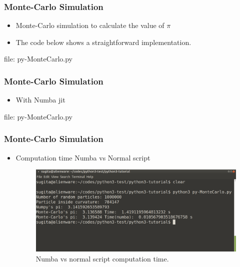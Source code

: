 \begin{frame}[fragile]
\frametitle{Monte-Carlo Simulation}
\newcommand{\newfilename}{py-MonteCarlo.py}
\begin{itemize}
\item Monte-Carlo simulation to calculate the value of $\pi$
\item The code below shows a straightforward implementation.

\end{itemize}
file: \newfilename
\end{frame}

\begin{frame}[fragile]
\frametitle{Monte-Carlo Simulation}
\newcommand{\newfilename}{py-MonteCarlo.py}
\begin{itemize}
\item With Numba jit

\end{itemize}
file: \newfilename
\end{frame}

\begin{frame}[fragile]
\frametitle{Monte-Carlo Simulation}
\begin{itemize}
\item Computation time Numba vs Normal script
\begin{figure}
\includegraphics[width=\textwidth]{numba-vs-normal.png}
\caption{Numba vs normal script computation time.}
\end{figure}
\end{itemize}
\end{frame}
